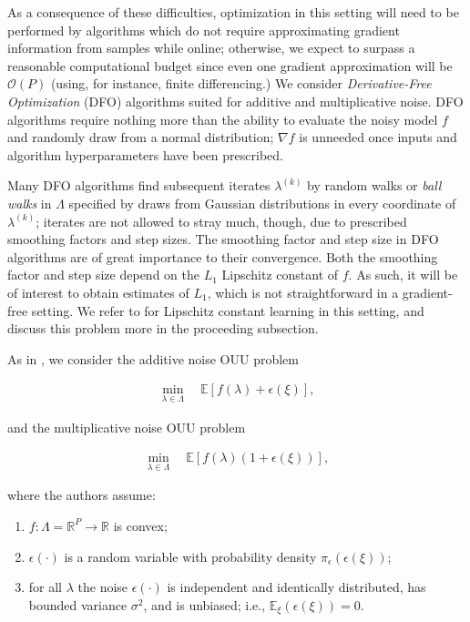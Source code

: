 \documentclass{amsart}
\newcommand{\R}{\mathbb{R}}
\begin{document}
As a consequence of these difficulties, optimization in this setting will need to be performed by algorithms which
do not require approximating gradient information from samples while online; otherwise, we expect to surpass a reasonable computational budget since even one gradient approximation will be $\mathcal{O}(P)$ (using, for instance, finite differencing.)
We consider \textit{Derivative-Free Optimization} (DFO) algorithms suited for additive and multiplicative noise. DFO algorithms require nothing more than the ability to evaluate the noisy model $f$ and randomly draw from a normal distribution; $\nabla f$ is unneeded once inputs and algorithm hyperparameters have been prescribed.

Many DFO algorithms find subsequent iterates $\lambda^{(k)}$ by random walks or \textit{ball walks} in $\Lambda$ specified by draws from Gaussian distributions in every coordinate of $\lambda^{(k)}$; iterates are not allowed to stray much, though, due to prescribed smoothing factors and step sizes. The smoothing factor and step size in DFO algorithms are of great importance to their convergence. Both the smoothing factor and step size depend on the $L_1$ Lipschitz constant of $f$. As such, it will be of interest to obtain estimates of $L_1$, which is not straightforward in a gradient-free setting. We refer to \cite{Calliess, KS} for Lipschitz constant learning in this setting, and discuss this problem more in the proceeding subsection.

As in \cite{CW}, we consider the additive noise OUU problem

\begin{eqnarray} \label{eq:1}
\min_{\lambda \in \Lambda} \quad \mathbb{E}\left[f(\lambda)+\epsilon(\xi)\right],
\end{eqnarray} 

\noindent and the multiplicative noise OUU problem

\begin{eqnarray} \label{eq:2}
\min_{\lambda \in \Lambda} \quad \mathbb{E}\left[f(\lambda)(1+\epsilon(\xi))\right],
\end{eqnarray} 

\noindent where the authors assume:

\begin{enumerate}[(i.)]

\item $f: \Lambda=\R^P \to \R$ is convex;

\item $\epsilon(\cdot)$ is a random variable with probability density $\pi_{\epsilon}(\epsilon(\xi))$;

\item for all $\lambda$ the noise $\epsilon(\cdot)$ is independent and identically distributed, has bounded variance $\sigma^2$, and is unbiased; i.e., $\mathbb{E}_\xi (\epsilon(\xi))=0$.



\end{enumerate}
\end{document}
